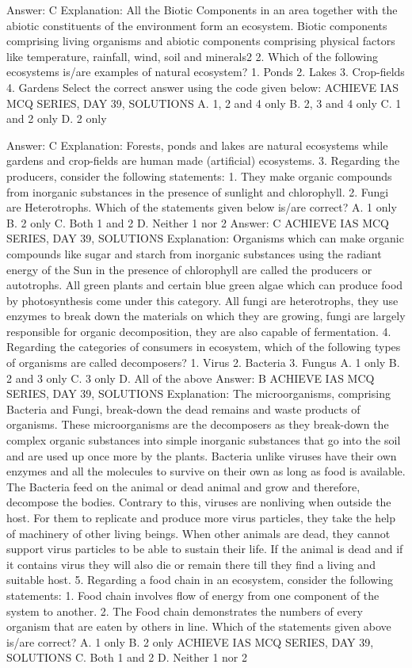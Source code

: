 Answer: C
Explanation: All the Biotic Components in an area together with the abiotic constituents of the environment form an ecosystem. Biotic components comprising living organisms and abiotic components comprising physical factors like temperature, rainfall, wind, soil and minerals2 2. Which of the following ecosystems is/are examples of natural ecosystem? 1. Ponds 2. Lakes 3. Crop-fields 4. Gardens Select the correct answer using the code given below: ACHIEVE IAS MCQ SERIES, DAY 39, SOLUTIONS A. 1, 2 and 4 only B. 2, 3 and 4 only C. 1 and 2 only D. 2 only 

Answer: C
Explanation: Forests, ponds and lakes are natural ecosystems while gardens and crop-fields are human made (artificial) ecosystems. 3. Regarding the producers, consider the following statements: 1. They make organic compounds from inorganic substances in the presence of sunlight and chlorophyll. 2. Fungi are Heterotrophs. Which of the statements given below is/are correct? A. 1 only B. 2 only C. Both 1 and 2 D. Neither 1 nor 2 
Answer: C ACHIEVE IAS MCQ SERIES, DAY 
39, SOLUTIONS
Explanation: Organisms which can make organic compounds like sugar and starch from inorganic substances using the radiant energy of the Sun in the presence of chlorophyll are called the producers or autotrophs. All green plants and certain blue green algae which can produce food by photosynthesis come under this category. All fungi are heterotrophs, they use enzymes to break down the materials on which they are growing, fungi are largely responsible for organic decomposition, they are also capable of fermentation. 4. Regarding the categories of consumers in ecosystem, which of the following types of organisms are called decomposers? 1. Virus 2. Bacteria 3. Fungus A. 1 only B. 2 and 3 only C. 3 only D. All of the above 
Answer: B ACHIEVE IAS MCQ SERIES, DAY 
39, SOLUTIONS
Explanation: The microorganisms, comprising Bacteria and Fungi, break-down the dead remains and waste products of organisms. These microorganisms are the decomposers as they break-down the complex organic substances into simple inorganic substances that go into the soil and are used up once more by the plants. Bacteria unlike viruses have their own enzymes and all the molecules to survive on their own as long as food is available. The Bacteria feed on the animal or dead animal and grow and therefore, decompose the bodies. Contrary to this, viruses are nonliving when outside the host. For them to replicate and produce more virus particles, they take the help of machinery of other living beings. When other animals are dead, they cannot support virus particles to be able to sustain their life. If the animal is dead and if it contains virus they will also die or remain there till they find a living and suitable host. 5. Regarding a food chain in an ecosystem, consider the following statements: 1. Food chain involves flow of energy from one component of the system to another. 2. The Food chain demonstrates the numbers of every organism that are eaten by others in line. Which of the statements given above is/are correct? A. 1 only B. 2 only ACHIEVE IAS MCQ SERIES, DAY 39, SOLUTIONS C. Both 1 and 2 D. Neither 1 nor 2 

